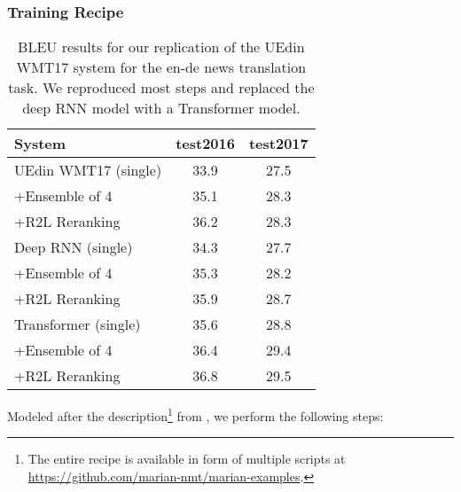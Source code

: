 \documentclass[11pt,a4paper]{article}
\begin{document}
  \subsubsection{Training Recipe}

  \begin{table}[t]
  \centering
  \begin{tabular}{lcc}\toprule
  System &	test2016 &	test2017 \\ \midrule
  UEdin WMT17 (single) & 33.9 & 27.5 \\ 
  +Ensemble of 4 & 35.1 & 28.3 \\ 
  +R2L Reranking & 36.2 &	28.3 \\ \midrule \midrule
  Deep RNN (single) & 34.3 & 27.7 \\ 
  +Ensemble of 4 & 35.3 & 28.2 \\ 
  +R2L Reranking & 35.9 & 28.7 \\ \midrule
  Transformer (single) &	35.6 &	28.8 \\
  +Ensemble of 4 &	36.4 &	29.4 \\ 
  +R2L Reranking &	36.8 &	29.5 \\ \bottomrule
  \end{tabular}
  \caption{BLEU results for our replication of the UEdin WMT17 system for the en-de news translation task.
  We reproduced most steps and replaced the deep RNN model with a Transformer model.}
  \label{wmt-bleu}
  \end{table}

  Modeled after the description\footnote{The entire recipe is available in form of multiple scripts at \url{https://github.com/marian-nmt/marian-examples}.} from , we perform the following steps:
\end{document}
